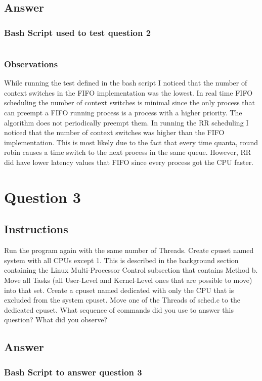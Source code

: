 \documentclass{assignment-x}
\begin{document}
\subsection{Answer}
\subsubsection{Bash Script used to test question 2}
\inputminted{bash}{../swap-scheduler-and-watch.sh}

\subsubsection{Observations}
While running the test defined in the bash script I noticed that the number of context switches in the FIFO implementation was the lowest. In real time FIFO scheduling the number of context switches is minimal since the only process that can preempt a FIFO running process is a process with a higher priority. The algorithm does not periodically preempt them. In running the RR scheduling I noticed that the number of context switches was higher than the FIFO implementation. This is most likely due to the fact that every time quanta, round robin causes a time switch to the next process in the same queue. However, RR did have lower latency values that FIFO since every process got the CPU faster.


\section{Question 3}
\subsection{Instructions}
Run the program again with the same number of Threads. Create cpuset named system with all CPUs except 1. This is described in the background section containing the Linux Multi-Processor Control subsection that contains Method b. Move all Tasks (all User-Level and Kernel-Level ones that are possible to move) into that set. Create a cpuset named dedicated with only the CPU that is excluded from the system cpuset. Move one of the Threads of sched.c to the dedicated cpuset. What sequence of commands did you use to answer this question? What did you observe?
\subsection{Answer}
\subsubsection{Bash Script to answer question 3}
\inputminted{bash}{../cpuset.sh}
\end{document}
